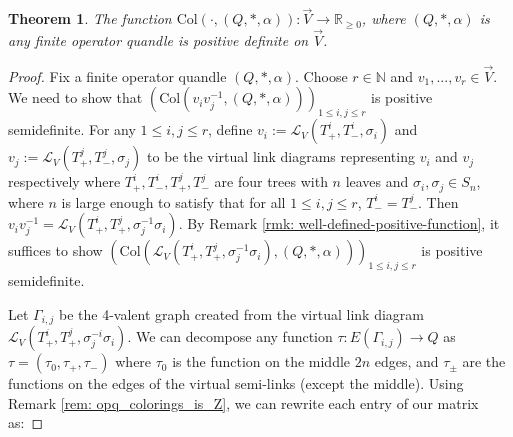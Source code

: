 \documentclass[11pt, twoside]{amsart}
\numberwithin{equation}{section}
\newtheorem{theorem}{Theorem}[subsection]
\theoremstyle{definition}
\numberwithin{equation}{section}
\begin{document}
\begin{theorem}\label{thm: function_of_positive_type_oriented}
    The function $\text{Col}(\cdot,(Q,*,
\alpha)):\vec{V}\to \mathbb{R}_{\geq 0}$, where $(Q,*,\alpha)$ is any finite operator quandle is positive definite on $\vec{V}$.
\end{theorem}

\begin{proof}
    Fix a finite operator quandle $(Q,*,\alpha)$. Choose $r\in \mathbb{N}$ and $v_1,...,v_r \in \vec{V}$. We need to show that $(\text{Col}(v_iv_j^{-1}, (Q,*,\alpha)))_{1\leq i,j \leq r}$ is positive semidefinite. For any $1\leq i,j\leq r$, define $v_i:=\mathscr{L}_{V}(T_+^i,T_-^i, \sigma_i)$ and $v_j:=\mathscr{L}_{V}(T_+^j, T_-^j, \sigma_j)$ to be the virtual link diagrams representing $v_i$ and $v_j$ respectively where $T_+^i, T_-^i, T_+^j, T_-^j$ are four trees with $n$ leaves and $\sigma_i, \sigma_j \in S_n$, where $n$ is large enough to satisfy that for all $1\leq i,j \leq r$, $T_-^i=T_-^j$. Then $v_iv_j^{-1}=\mathscr{L}_{V}(T_+^i, T_+^j, \sigma_j^{-1} \sigma_i)$. By Remark \ref{rmk: well-defined-positive-function}, it suffices to show $\left(\text{Col}(\mathscr{L}_{V}(T_+^i, T_+^j, \sigma_j^{-1}\sigma_i), (Q,*,\alpha))\right)_{1\leq i,j\leq r}$ is positive semidefinite. 

    Let $\Gamma_{i,j}$ be the 4-valent graph created from the virtual link diagram $\mathscr{L}_{V}(T_+^i, T_+^j, \sigma_j^{-i}\sigma_i)$. We can decompose any function $\tau:E(\Gamma_{i,j})\to Q$ as $\tau=(\tau_0, \tau_+, \tau_-)$ where $\tau_0$ is the function on the middle $2n$ edges, and $\tau_\pm$ are the functions on the edges of the virtual semi-links (except the middle). Using Remark \ref{rem: opq_colorings_is_Z}, we can rewrite each entry of our matrix as:


\end{proof}
\end{document}
